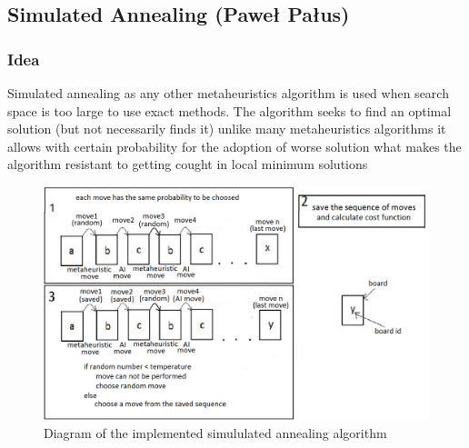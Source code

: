 \documentclass[pdftex]{article}
\begin{document}
\subsection{Simulated Annealing (Paweł Pałus)}
\label{sec:annealing}

\subsubsection{Idea}
Simulated annealing as any other metaheuristics algorithm is used when search space is too large to use exact methods. The algorithm seeks to find an optimal solution (but not necessarily finds it) unlike many metaheuristics algorithms it allows with certain probability for the adoption of worse solution what makes the algorithm resistant to getting cought in local minimum solutions

\begin{figure}[!htb]
	\centering
	\includegraphics[width=1\textwidth]{annealing/annealingSchema.png} 
	\caption{Diagram of the implemented simululated annealing algorithm}
	\label{fig:annealingSchema}
\end{figure}
\end{document}
